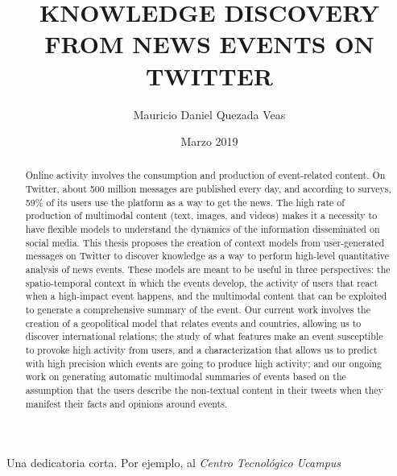 \documentclass[upright, contnum]{umemoria}
\author{Mauricio Daniel Quezada Veas}
\title{KNOWLEDGE DISCOVERY FROM NEWS EVENTS ON TWITTER}
\date{Marzo 2019}
\begin{document}
\frontmatter
\maketitle 

\begin{abstract} 

    Online activity involves the consumption and production of event-related
    content. 
    On Twitter, about 500 million messages are published every day, and
    according to surveys, 59\% of its users use the platform as a way to get the
    news. 
    The high rate of production of multimodal content (text, images, and videos)
    makes it a necessity to have flexible models to understand the dynamics of
    the information disseminated on social media. 
    This thesis proposes the creation of context models from user-generated
    messages on Twitter to discover knowledge as a way to perform high-level
    quantitative analysis of news events. 
    These models are meant to be useful in three perspectives: the
    spatio-temporal context in which the events develop, the activity of users
    that react when a high-impact event happens, and the multimodal content that
    can be exploited to generate a comprehensive summary of the event. 
    Our current work involves the creation of a geopolitical model that relates
    events and countries, allowing us to discover international relations; 
    the study of what features make an event susceptible to provoke high
    activity from users, and a characterization that allows us to predict with
    high precision which events are going to produce high activity; 
    and our ongoing work on generating automatic multimodal summaries of events
    based on the assumption that the users describe the non-textual content in
    their tweets when they manifest their facts and opinions around events.
\end{abstract}

\begin{dedicatoria} %
Una dedicatoria corta. Por ejemplo, al \emph{Centro Tecnológico Ucampus}
\end{dedicatoria}

\begin{thanks} %
\lipsum[1-2]
\end{thanks}
\cleardoublepage

\tableofcontents
\listoftables %
\listoffigures %

\mainmatter









 





\listoftodos[Notes]  %
\end{document}
